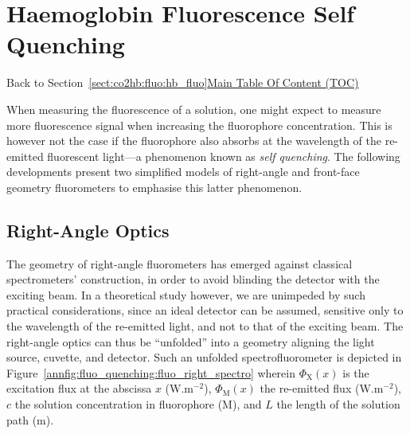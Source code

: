 \chapter{Haemoglobin Fluorescence Self Quenching}\label{app:haemo_self_quench}

\begin{appbox}
	Back to Section~\ref{sect:co2hb:fluo:hb_fluo}\hfill \hyperref[chapter:toc]{Main Table Of Content (TOC)}
\end{appbox}

When measuring the fluorescence of a solution, one might expect to measure more fluorescence signal when increasing the fluorophore concentration. This is however not the case if the fluorophore also absorbs at the wavelength of the re-emitted fluorescent light---a phenomenon known as \emph{self quenching}. The following developments present two simplified models of right-angle and front-face geometry fluorometers to emphasise this latter phenomenon.

\section{Right-Angle Optics}

The geometry of right-angle fluorometers has emerged against classical spectrometers' construction, in order to avoid blinding the detector with the exciting beam\cite{jameson2003}. In a theoretical study however, we are unimpeded by such practical considerations, since an ideal detector can be assumed, sensitive only to the wavelength of the re-emitted light, and not to that of the exciting beam. The right-angle optics can thus be \enquote{unfolded} into a geometry aligning the light source, cuvette, and detector. Such an unfolded spectrofluorometer is depicted in Figure~\ref{annfig:fluo_quenching:fluo_right_spectro} wherein $\Phi_\text{X}(x)$ is the excitation flux at the abscissa $x$ (W.m$^{-2}$), $\Phi_\text{M}(x)$ the re-emitted flux (W.m$^{-2}$), $c$ the solution concentration in fluorophore (M), and $L$ the length of the solution path (m).

